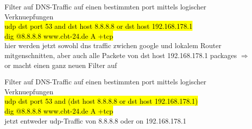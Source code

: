 \documentclass[]{article}
\begin{document}
\begin{description}
	\item Filter auf DNS-Traffic auf einen bestimmten port mittels logischer Verknuepfungen  \\ 
	{\hl{udp dst port 53 and dst host 8.8.8.8 or dst host 192.168.178.1}} \\
	{\hl{dig @8.8.8.8 www.cbt-24.de A +tcp}} \\ 
	hier werden jetzt sowohl dns traffic zwichen google und lokalem Router mitgenschnitten, aber auch alle Packete von dst host 192.168.178.1 packages  $\Rightarrow$ or macht einen ganz neuen Filter auf
	
	\item Filter auf DNS-Traffic auf einen bestimmten port mittels logischer Verknuepfungen  \\ 
	{\hl{udp dst port 53 and (dst host 8.8.8.8 or dst host 192.168.178.1)}} \\
	{\hl{dig @8.8.8.8 www.cbt-24.de A +tcp}} \\ 
	jetzt entweder udp-Traffic von 8.8.8.8 oder on 192.168.178.1
	
	
	
	
\end{description}
\end{document}
